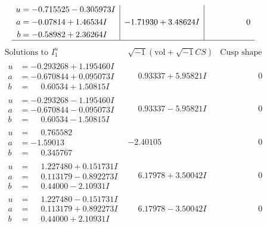 \documentclass[1p]{elsarticle_modified}
\theoremstyle{definition}
\newcommand{\I}{\sqrt{-1}}
\begin{document}
$$\begin{array}{c|c|c}
\begin{aligned}
u &= -0.715525 - 0.305973 I \\
a &= -0.07814 + 1.46534 I \\
b &= -0.58982 + 2.36264 I\end{aligned}
 & -1.71930 + 3.48624 I & \phantom{-0.000000 } 0\\
 \hline 
 \end{array}$$\newpage$$\begin{array}{c|c|c}  
\text{Solutions to }I^u_{1}& \I (\text{vol} + \sqrt{-1}CS) & \text{Cusp shape}\\
 \hline 
\begin{aligned}
u &= -0.293268 + 1.195460 I \\
a &= -0.670844 + 0.095073 I \\
b &= \phantom{-}0.60534 + 1.50815 I\end{aligned}
 & \phantom{-}0.93337 + 5.95821 I & \phantom{-0.000000 } 0 \\ \hline\begin{aligned}
u &= -0.293268 - 1.195460 I \\
a &= -0.670844 - 0.095073 I \\
b &= \phantom{-}0.60534 - 1.50815 I\end{aligned}
 & \phantom{-}0.93337 - 5.95821 I & \phantom{-0.000000 } 0 \\ \hline\begin{aligned}
u &= \phantom{-}0.765582\phantom{ +0.000000I} \\
a &= -1.59013\phantom{ +0.000000I} \\
b &= \phantom{-}0.345767\phantom{ +0.000000I}\end{aligned}
 & -2.40105\phantom{ +0.000000I} & \phantom{-0.000000 } 0 \\ \hline\begin{aligned}
u &= \phantom{-}1.227480 + 0.151731 I \\
a &= \phantom{-}0.113179 - 0.892273 I \\
b &= \phantom{-}0.44000 - 2.10931 I\end{aligned}
 & \phantom{-}6.17978 + 3.50042 I & \phantom{-0.000000 } 0 \\ \hline\begin{aligned}
u &= \phantom{-}1.227480 - 0.151731 I \\
a &= \phantom{-}0.113179 + 0.892273 I \\
b &= \phantom{-}0.44000 + 2.10931 I\end{aligned}
 & \phantom{-}6.17978 - 3.50042 I & \phantom{-0.000000 } 0 \\ \hline\begin{aligned}

\end{aligned}
\end{array}$$
\end{document}
